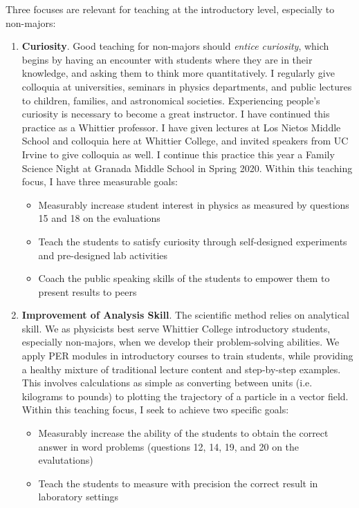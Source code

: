 \documentclass[../../main.tex]{subfiles}
\begin{document}
Three focuses are relevant for teaching at the introductory level, especially to non-majors:
\begin{enumerate}
\item \textbf{Curiosity}.  Good teaching for non-majors should \textit{entice curiosity}, which begins by having an encounter with students where they are in their knowledge, and asking them to think more quantitatively.  I regularly give colloquia at universities, seminars in physics departments, and public lectures to children, families, and astronomical societies.  Experiencing people's curiosity is necessary to become a great instructor.  I have continued this practice as a Whittier professor.  I have given lectures at Los Nietos Middle School and colloquia here at Whittier College, and invited speakers from UC Irvine to give colloquia as well.  I continue this practice this year a Family Science Night at Granada Middle School in Spring 2020.  Within this teaching focus, I have three measurable goals:

\begin{itemize}
\item Measurably increase student interest in physics as measured by questions 15 and 18 on the evaluations
\item Teach the students to satisfy curiosity through self-designed experiments and pre-designed lab activities %
\item Coach the public speaking skills of the students to empower them to present results to peers %
\end{itemize}

\item \textbf{Improvement of Analysis Skill}.  The scientific method relies on analytical skill.  We as physicists best serve Whittier College introductory students, especially non-majors, when we develop their problem-solving abilities.  We apply PER modules in introductory courses to train students, while providing a healthy mixture of traditional lecture content and step-by-step examples.  This involves calculations as simple as converting between units (i.e. kilograms to pounds) to plotting the trajectory of a particle in a vector field.  Within this teaching focus, I seek to achieve two specific goals:

\begin{itemize}
\item Measurably increase the ability of the students to obtain the correct answer in word problems (questions 12, 14, 19, and 20 on the evalutations)
\item Teach the students to measure with precision the correct result in laboratory settings 
\end{itemize}


\end{enumerate}
\end{document}
